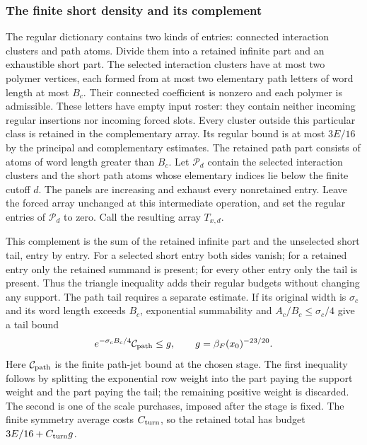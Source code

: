 \subsubsection{The finite short density and its complement}
The regular dictionary contains two kinds of entries: connected
interaction clusters and path atoms. Divide them into a retained
infinite part and an exhaustible short part. The selected interaction clusters have at most two polymer vertices,
each formed from at most two elementary path letters of word length
at most $B_c$. Their connected coefficient is nonzero and each
polymer is admissible. These letters have empty input roster: they
contain neither incoming regular insertions nor incoming forced
slots. Every cluster outside this particular class is retained in
the complementary array. Its regular bound is at most $3E/16$ by
the principal and complementary estimates. The retained path part
consists of atoms of word length greater than $B_c$. Let
$\mathcal P_d$ contain the selected interaction clusters and the
short path atoms whose elementary indices lie below the finite
cutoff $d$. The panels are increasing and exhaust every nonretained entry. Leave
the forced array unchanged at this intermediate operation, and set the
regular entries of $\mathcal P_d$ to zero. Call the resulting array
$T_{x,d}$.

This complement is the sum of the retained infinite part and the
unselected short tail, entry by entry. For a selected short entry both
sides vanish; for a retained entry only the retained summand is present;
for every other entry only the tail is present. Thus the triangle
inequality adds their regular budgets without changing any support.
The path tail requires a separate estimate. If its original width is
$\sigma_c$ and its word length exceeds $B_c$, exponential summability
and $A_c/B_c\le\sigma_c/4$ give a tail bound
\[
 e^{-\sigma_cB_c/4}\mathcal C_{\rm path}\le g,
                  \qquad g=\beta_F(x_0)^{-23/20}.
\]
Here $\mathcal C_{\rm path}$ is the finite path-jet bound at the chosen
stage. The first inequality follows by splitting the exponential row
weight into the part paying the support weight and the part paying
the tail; the remaining positive weight is discarded. The second is
one of the scale purchases, imposed after the stage is fixed. The
finite symmetry average costs $C_{\rm turn}$, so the retained total
has budget $3E/16+C_{\rm turn}g$.

